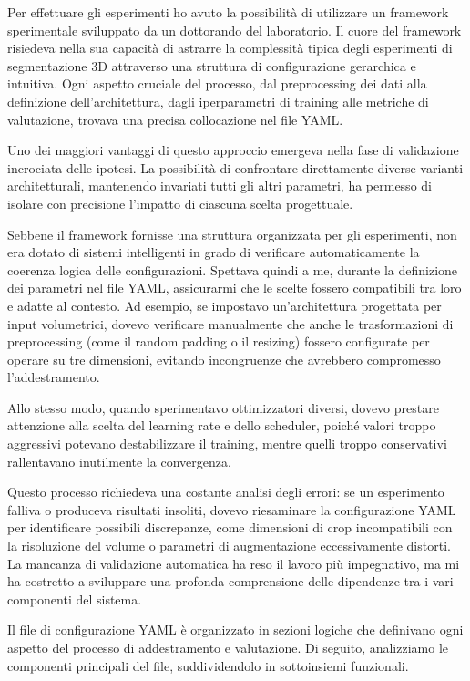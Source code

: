 
Per effettuare gli esperimenti ho avuto la possibilità di utilizzare un framework sperimentale sviluppato da un dottorando del laboratorio. Il cuore del framework risiedeva nella sua capacità di astrarre la complessità tipica degli esperimenti di segmentazione 3D attraverso una struttura di configurazione gerarchica e intuitiva. Ogni aspetto cruciale del processo, dal preprocessing dei dati alla definizione dell'architettura, dagli iperparametri di training alle metriche di valutazione, trovava una precisa collocazione nel file YAML.

Uno dei maggiori vantaggi di questo approccio emergeva nella fase di validazione incrociata delle ipotesi. La possibilità di confrontare direttamente diverse varianti architetturali, mantenendo invariati tutti gli altri parametri, ha permesso di isolare con precisione l'impatto di ciascuna scelta progettuale.


Sebbene il framework fornisse una struttura organizzata per gli esperimenti, non era dotato di sistemi intelligenti in grado di verificare automaticamente la coerenza logica delle configurazioni. Spettava quindi a me, durante la definizione dei parametri nel file YAML, assicurarmi che le scelte fossero compatibili tra loro e adatte al contesto. Ad esempio, se impostavo un'architettura progettata per input volumetrici, dovevo verificare manualmente che anche le trasformazioni di preprocessing (come il random padding o il resizing) fossero configurate per operare su tre dimensioni, evitando incongruenze che avrebbero compromesso l'addestramento. 


Allo stesso modo, quando sperimentavo ottimizzatori diversi, dovevo prestare attenzione alla scelta del learning rate e dello scheduler, poiché valori troppo aggressivi potevano destabilizzare il training, mentre quelli troppo conservativi rallentavano inutilmente la convergenza. 

Questo processo richiedeva una costante analisi degli errori: se un esperimento falliva o produceva risultati insoliti, dovevo riesaminare la configurazione YAML per identificare possibili discrepanze, come dimensioni di crop incompatibili con la risoluzione del volume o parametri di augmentazione eccessivamente distorti. La mancanza di validazione automatica ha reso il lavoro più impegnativo, ma mi ha costretto a sviluppare una profonda comprensione delle dipendenze tra i vari componenti del sistema.


Il file di configurazione YAML è organizzato in sezioni logiche che definivano ogni aspetto del processo di addestramento e valutazione. Di seguito, analizziamo le componenti principali del file, suddividendolo in sottoinsiemi funzionali.

